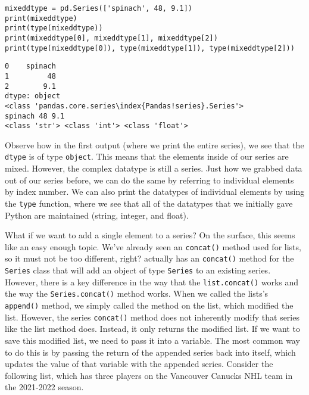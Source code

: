 \begin{lstlisting}[style=pippython]
mixeddtype = pd.Series(['spinach', 48, 9.1])
print(mixeddtype)
print(type(mixeddtype))
print(mixeddtype[0], mixeddtype[1], mixeddtype[2])
print(type(mixeddtype[0]), type(mixeddtype[1]), type(mixeddtype[2]))
\end{lstlisting}
\begin{lstlisting}
0    spinach
1         48
2        9.1
dtype: object
<class 'pandas.core.series\index{Pandas!series}.Series'>
spinach 48 9.1
<class 'str'> <class 'int'> <class 'float'>
\end{lstlisting}
Observe how in the first output (where we print the entire series), we see that the \verb|dtype| is of type \verb|object|. This means that the elements inside of our series are mixed. However, the complex datatype is still a series. Just how we grabbed data out of our series before, we can do the same by referring to individual elements by index number. We can also print the datatypes of individual elements by using the \verb|type| function, where we see that all of the datatypes that we initially gave Python are maintained (string, integer, and float).\par
What if we want to add a single element to a series? On the surface, this seems like an easy enough topic. We've already seen an \verb|concat()| method used for lists, so it must not be too different, right?  actually has an \verb|concat()| method for the \verb|Series| class that will add an object of type \verb|Series| to an existing series. However, there is a key difference in the way that the \verb|list.concat()| works and the way the \verb|Series.concat()| method works. When we called the lists's \verb|append()| method, we simply called the method on the list, which modified the list. However, the  series \verb|concat()| method does not inherently modify that series like the list method does. Instead, it only returns the modified list. If we want to save this modified list, we need to pass it into a variable. The most common way to do this is by passing the return of the appended series back into itself, which updates the value of that variable with the appended series.
Consider the following list, which has three players on the Vancouver Canucks NHL team in the 2021-2022 season.\par
